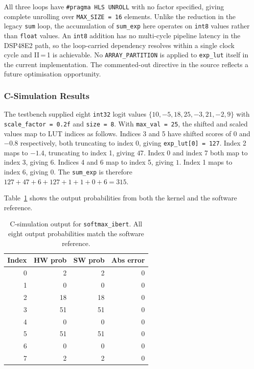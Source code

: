 All three loops have \texttt{\#pragma HLS UNROLL} with no factor specified,
giving complete unrolling over \texttt{MAX\_SIZE = 16} elements. Unlike the
reduction in the legacy \texttt{sum} loop, the accumulation of \texttt{sum\_exp}
here operates on \texttt{int8} values rather than \texttt{float} values. An
\texttt{int8} addition has no multi-cycle pipeline latency in the DSP48E2 path,
so the loop-carried dependency resolves within a single clock cycle and II\,=\,1
is achievable. No \texttt{ARRAY\_PARTITION} is applied to \texttt{exp\_lut}
itself in the current implementation. The commented-out directive in the source
reflects a future optimisation opportunity.

\subsubsection{C-Simulation Results}
\label{subsubsec:softmax_ibert_csim}

The testbench supplied eight \texttt{int32} logit values
$\{10, -5, 18, 25, -3, 21, -2, 9\}$ with \texttt{scale\_factor\,=\,0.2f} and
\texttt{size\,=\,8}. With \texttt{max\_val\,=\,25}, the shifted and scaled
values map to LUT indices as follows. Indices 3 and 5 have shifted scores of 0
and $-0.8$ respectively, both truncating to index 0, giving
\texttt{exp\_lut[0]\,=\,127}. Index 2 maps to $-1.4$, truncating to index 1,
giving $47$. Index 0 and index 7 both map to index 3, giving $6$. Indices 4
and 6 map to index 5, giving $1$. Index 1 maps to index 6, giving $0$.
The \texttt{sum\_exp} is therefore $127+47+6+127+1+1+0+6 = 315$.

Table~\ref{tab:softmax_ibert_csim} shows the output probabilities from both the
kernel and the software reference.

\begin{table}[H]
  \centering
  \begin{tabular}{rrrr}
    \toprule
    Index & HW prob & SW prob & Abs error \\
    \midrule
    0 &  2 &  2 & 0 \\
    1 &  0 &  0 & 0 \\
    2 & 18 & 18 & 0 \\
    3 & 51 & 51 & 0 \\
    4 &  0 &  0 & 0 \\
    5 & 51 & 51 & 0 \\
    6 &  0 &  0 & 0 \\
    7 &  2 &  2 & 0 \\
    \bottomrule
  \end{tabular}
  \caption{C-simulation output for \texttt{softmax\_ibert}.
           All eight output probabilities match the software reference.}
  \label{tab:softmax_ibert_csim}
\end{table}

